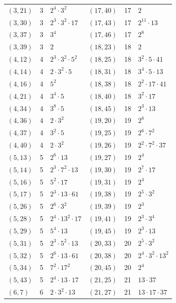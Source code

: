 \documentclass[11pt]{article}
\begin{document}
\begin{longtable}{@{}lrl@{\qquad}lrl@{}}
$(3,21)$ & 3 & $2^{4}\cdot 3^{2}$ & $(17,40)$ & 17 & $2$\\
$(3,30)$ & 3 & $2^{3}\cdot 3^{2}\cdot 17$ & $(17,43)$ & 17 & $2^{11}\cdot 13$\\
$(3,37)$ & 3 & $3^{4}$ & $(17,46)$ & 17 & $2^{8}$\\
$(3,39)$ & 3 & $2$ & $(18,23)$ & 18 & $2$\\
$(4,12)$ & 4 & $2^{3}\cdot 3^{2}\cdot 5^{2}$ & $(18,25)$ & 18 & $3^{2}\cdot 5\cdot 41$\\
$(4,14)$ & 4 & $2\cdot 3^{2}\cdot 5$ & $(18,31)$ & 18 & $3^{4}\cdot 5\cdot 13$\\
$(4,16)$ & 4 & $5^{2}$ & $(18,38)$ & 18 & $2^{2}\cdot 17\cdot 41$\\
$(4,21)$ & 4 & $3^{4}\cdot 5$ & $(18,40)$ & 18 & $3^{2}\cdot 17$\\
$(4,34)$ & 4 & $3^{8}\cdot 5$ & $(18,45)$ & 18 & $2^{3}\cdot 13$\\
$(4,36)$ & 4 & $2\cdot 3^{2}$ & $(19,20)$ & 19 & $2^{8}$\\
$(4,37)$ & 4 & $3^{2}\cdot 5$ & $(19,25)$ & 19 & $2^{6}\cdot 7^{2}$\\
$(4,40)$ & 4 & $2\cdot 3^{2}$ & $(19,26)$ & 19 & $2^{2}\cdot 7^{2}\cdot 37$\\
$(5,13)$ & 5 & $2^{6}\cdot 13$ & $(19,27)$ & 19 & $2^{4}$\\
$(5,14)$ & 5 & $2^{3}\cdot 7^{2}\cdot 13$ & $(19,30)$ & 19 & $2^{7}\cdot 17$\\
$(5,16)$ & 5 & $5^{2}\cdot 17$ & $(19,31)$ & 19 & $2^{4}$\\
$(5,17)$ & 5 & $2^{3}\cdot 13\cdot 61$ & $(19,38)$ & 19 & $2^{5}\cdot 3^{2}$\\
$(5,26)$ & 5 & $2^{6}\cdot 3^{2}$ & $(19,39)$ & 19 & $2^{3}$\\
$(5,28)$ & 5 & $2^{4}\cdot 13^{2}\cdot 17$ & $(19,41)$ & 19 & $2^{3}\cdot 3^{4}$\\
$(5,29)$ & 5 & $5^{4}\cdot 13$ & $(19,45)$ & 19 & $2^{3}\cdot 13$\\
$(5,31)$ & 5 & $2^{3}\cdot 5^{2}\cdot 13$ & $(20,33)$ & 20 & $2^{5}\cdot 3^{2}$\\
$(5,32)$ & 5 & $2^{6}\cdot 13\cdot 61$ & $(20,38)$ & 20 & $2^{4}\cdot 3^{2}\cdot 13^{2}$\\
$(5,34)$ & 5 & $7^{2}\cdot 17^{2}$ & $(20,45)$ & 20 & $2^{4}$\\
$(5,43)$ & 5 & $2^{4}\cdot 13\cdot 17$ & $(21,25)$ & 21 & $13\cdot 37$\\
$(6,7)$ & 6 & $2\cdot 3^{2}\cdot 13$ & $(21,27)$ & 21 & $13\cdot 17\cdot 37$\\

\end{longtable}
\end{document}
